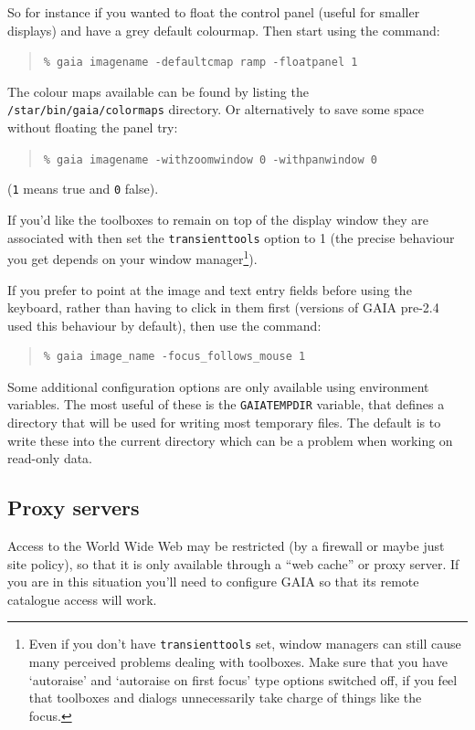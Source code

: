 \documentclass[twoside,11pt]{article}
\newcommand{\xlabel}[1]{}
\renewcommand{\_}{\texttt{\symbol{95}}}
\newcommand{\mytt}[1]{{\texttt{#1}}}
\begin{document}
So for instance if you wanted to float the control panel (useful for
smaller displays) and have a grey default colourmap. Then start
using the command:
\begin{quote}
\mytt{\% gaia image\_name -default\_cmap ramp -float\_panel 1}
\end{quote}
The colour maps available can be found by listing the
\mytt{/star/bin/gaia/colormaps} directory. Or alternatively to save
some space without floating the panel try:
\begin{quote}
\mytt{\% gaia image\_name -with\_zoom\_window 0 -with\_pan\_window 0}
\end{quote}
(\mytt{1} means true and \mytt{0} false).

If you'd like the toolboxes to remain on top of the display window
they are associated with then set the \mytt{transient\_tools} option
to 1 (the precise behaviour you get depends on your window
manager\footnote{Even if you don't have \mytt{transient\_tools} set,
window managers can still cause many perceived problems dealing with
toolboxes. Make sure that you have `autoraise' and `autoraise on first
focus' type options switched off, if you feel that toolboxes and
dialogs unnecessarily take charge of things like the focus.}).

If you prefer to point at the image and text entry fields before using
the keyboard, rather than having to click in them first (versions of
GAIA pre-2.4 used this behaviour by default), then use the command:
\begin{quote}
\begin{verbatim}
% gaia image_name -focus_follows_mouse 1
\end{verbatim}
\end{quote}

Some additional configuration options are only available using environment
variables. The most useful of these is the \mytt{GAIA\_TEMP\_DIR} variable,
that defines a directory that will be used for writing most temporary files.
The default is to write these into the current directory which can be a
problem when working on read-only data.

\subsection{\xlabel{proxy_servers}Proxy servers}
Access to the World Wide Web may be restricted (by a firewall or maybe
just site policy), so that it is only available through a ``web
cache'' or proxy server. If you are in this situation you'll need to
configure GAIA so that its remote catalogue access will work.
\end{document}
